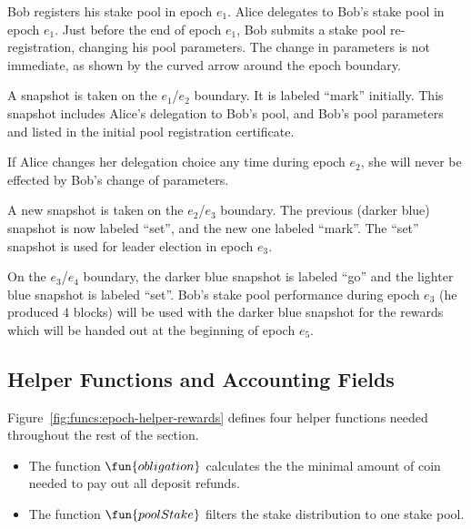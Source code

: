 Bob registers his stake pool in epoch $e_1$.
Alice delegates to Bob's stake pool in epoch $e_1$.
Just before the end of epoch $e_1$, Bob submits a stake pool re-registration,
changing his pool parameters. The change in parameters is not immediate,
as shown by the curved arrow around the epoch boundary.

A snapshot is taken on the $e_1$/$e_2$ boundary. It is labeled ``mark'' initially.
This snapshot includes Alice's delegation to Bob's pool, and Bob's pool parameters
and listed in the initial pool registration certificate.

If Alice changes her delegation choice any time during epoch $e_2$,
she will never be effected by Bob's change of parameters.

A new snapshot is taken on the $e_2$/$e_3$ boundary.
The previous (darker blue) snapshot is now labeled ``set'', and the new one labeled ``mark''.
The ``set'' snapshot is used for leader election in epoch $e_3$.

On the $e_3$/$e_4$ boundary, the darker blue snapshot is labeled ``go'' and
the lighter blue snapshot is labeled ``set''.
Bob's stake pool performance during epoch $e_3$ (he produced 4 blocks)
will be used with the darker blue snapshot for the rewards which will
be handed out at the beginning of epoch $e_5$.

\subsection{Helper Functions and Accounting Fields}
\label{sec:stake-dist-helpers}

Figure~\ref{fig:funcs:epoch-helper-rewards} defines four helper functions needed
throughout the rest of the section.

\begin{itemize}
  \item The function $\fun{obligation}$ calculates the the minimal amount of coin needed to
    pay out all deposit refunds.
  \item The function $\fun{poolStake}$ filters the stake distribution to one stake pool.
\end{itemize}


